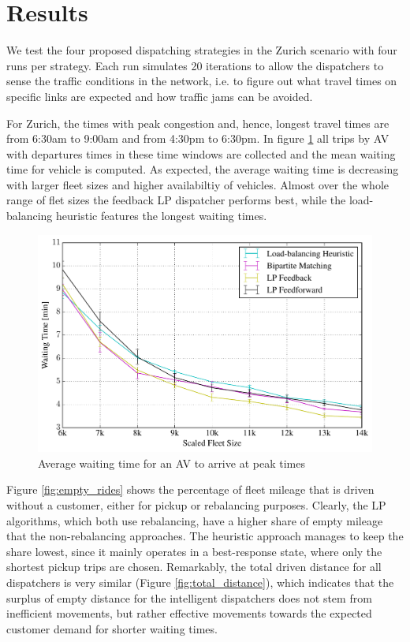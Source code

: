 \section{Results}
\label{sec:results}

We test the four proposed dispatching strategies in the Zurich scenario with four
runs per strategy. Each run simulates 20 iterations to allow the dispatchers to sense
the traffic conditions in the network, i.e. to figure out what travel times on
specific links are expected and how traffic jams can be avoided.

For Zurich, the times with peak congestion and, hence, longest travel times are
from 6:30am to 9:00am and from 4:30pm to 6:30pm. In figure \ref{fig:mean_peak_waiting_times}
all trips by AV with departures times in these time windows are collected
and the mean waiting time for vehicle is computed. As expected, the average
waiting time is decreasing with larger fleet sizes and higher availabiltiy of
vehicles. Almost over the whole range of flet sizes the feedback LP dispatcher
performs best, while the load-balancing heuristic features the longest waiting
times.

\begin{figure}
\includegraphics[width=1.0\textwidth]{figures/mean_peak_waiting_times.pdf}
\caption{Average waiting time for an AV to arrive at peak times}
\label{fig:mean_peak_waiting_times}
\end{figure}

Figure \ref{fig:empty_rides} shows the percentage of fleet mileage that is driven
without a customer, either for pickup or rebalancing purposes. Clearly, the LP
algorithms, which both use rebalancing, have a higher share of empty mileage
that the non-rebalancing approaches. The heuristic approach manages to keep the
share lowest, since it mainly operates in a best-response state, where only the
shortest pickup trips are chosen. Remarkably, the total driven distance for all
dispatchers is very similar (Figure \ref{fig:total_distance}), which indicates
that the surplus of empty distance for the intelligent dispatchers does not stem
from inefficient movements, but rather effective movements towards the expected
customer demand for shorter waiting times.

